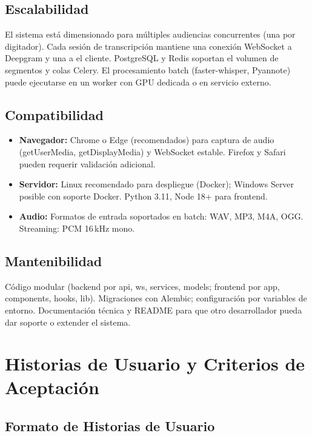 \documentclass[12pt,a4paper]{report}
\begin{document}
\section{Escalabilidad}

El sistema está dimensionado para múltiples audiencias concurrentes (una por digitador). Cada sesión de transcripción mantiene una conexión WebSocket a Deepgram y una a el cliente. PostgreSQL y Redis soportan el volumen de segmentos y colas Celery. El procesamiento batch (faster-whisper, Pyannote) puede ejecutarse en un worker con GPU dedicada o en servicio externo.

\section{Compatibilidad}

\begin{itemize}
    \item \textbf{Navegador:} Chrome o Edge (recomendados) para captura de audio (getUserMedia, getDisplayMedia) y WebSocket estable. Firefox y Safari pueden requerir validación adicional.
    \item \textbf{Servidor:} Linux recomendado para despliegue (Docker); Windows Server posible con soporte Docker. Python 3.11, Node 18+ para frontend.
    \item \textbf{Audio:} Formatos de entrada soportados en batch: WAV, MP3, M4A, OGG. Streaming: PCM 16\,kHz mono.
\end{itemize}

\section{Mantenibilidad}

Código modular (backend por api, ws, services, models; frontend por app, components, hooks, lib). Migraciones con Alembic; configuración por variables de entorno. Documentación técnica y README para que otro desarrollador pueda dar soporte o extender el sistema.

\chapter{Historias de Usuario y Criterios de Aceptación}

\section{Formato de Historias de Usuario}
\end{document}
